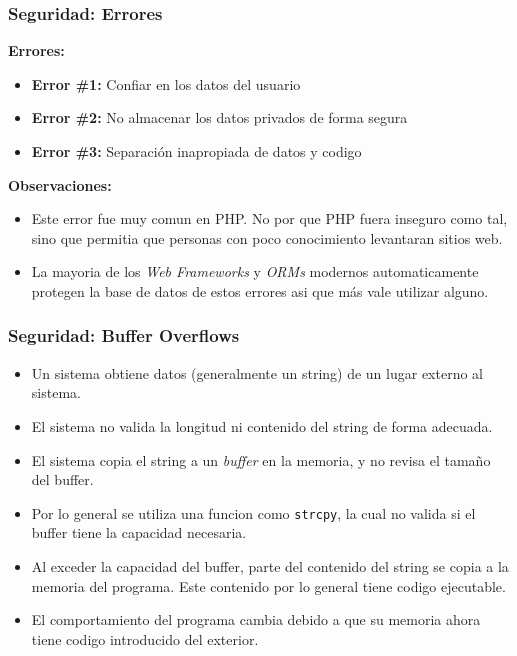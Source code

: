 \documentclass{beamer}
\begin{document}
\begin{frame}
    \frametitle{Seguridad: Errores}
    {\bf Errores:}
    \begin{itemize}
        \item{{\bf Error \#1:} Confiar en los datos del usuario}
        \item{{\bf Error \#2:} No almacenar los datos privados de forma segura}
        \item{{\bf Error \#3:} Separaci\'on inapropiada de datos y codigo}
    \end{itemize}
    {\bf Observaciones:}
    \begin{itemize}
        \item{Este error fue muy comun en PHP. No por que PHP
        fuera inseguro como tal, sino que permitia que personas
        con poco conocimiento levantaran sitios web.}
        \item{La mayoria de los \emph{Web Frameworks} y \emph{ORMs}
        modernos automaticamente protegen la base de datos de estos
        errores asi que m\'as vale utilizar alguno.}
    \end{itemize}
\end{frame}

\begin{frame}
    \frametitle{Seguridad: Buffer Overflows}
    \begin{itemize}
        \item{Un sistema obtiene datos (generalmente un string)
        de un lugar externo al sistema.}
        \item{El sistema no valida la longitud ni contenido del
        string de forma adecuada.}
        \item{El sistema copia el string a un \emph{buffer} en
        la memoria, y no revisa el tama\~no del buffer.}
        \item{Por lo general se utiliza una funcion como
        \texttt{strcpy}, la cual no valida si el buffer tiene la
        capacidad necesaria.}
        \item{Al exceder la capacidad del buffer, parte del contenido
        del string se copia a la memoria del programa. Este contenido
        por lo general tiene codigo ejecutable.}
        \item{El comportamiento del programa cambia debido a que
        su memoria ahora tiene codigo introducido del exterior.}
    \end{itemize}
\end{frame}
\end{document}
